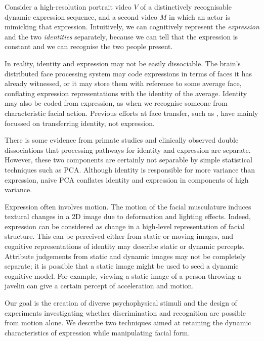 \documentclass[runningheads]{llncs}
\begin{document}
Consider a high-resolution portrait video $V$ of a distinctively recognisable dynamic expression sequence, and a second video $M$ in which an actor is mimicking that expression. Intuitively, we can cognitively represent the \textit{expression} and the two \textit{identities} separately, because we can tell that the expression is constant and we can recognise the two people present.



In reality, identity and expression may not be easily dissociable. The brain's distributed face processing system\cite{haxby2000distributed} may code expressions in terms of faces it has already witnessed, or it may store them with reference to some average face, conflating expression representations with the identity of the average. Identity may also be coded from expression, as when we recognise someone from characteristic facial action. Previous efforts at face transfer, such as \cite{bitouk2008face}, have mainly focussed on transferring identity, not expression.

There is some evidence from primate studies\cite{hasselmo1989role} and clinically observed double dissociations\cite{parry1991dissociable} that processing pathways for identity and expression are separate. However, these two components are certainly not separable by simple statistical techniques such as PCA. Although identity is responsible for more variance than expression, naive PCA conflates identity and expression in components of high variance\cite{calder2001principal}.

Expression often involves motion\cite{rosenblum1996human,essa1995facial,bassili1978facial}. The motion of the facial musculature induces textural changes in a 2D image due to deformation and lighting effects. Indeed, expression can be considered as change in a high-level representation of facial structure. This can be perceived either from static or moving images, and cognitive representations of identity may describe static or dynamic percepts. Attribute judgements from static and dynamic images may not be completely separate; it is possible that a static image might be used to seed a dynamic cognitive model. For example, viewing a static image of a person throwing a javelin can give a certain percept of acceleration and motion.


Our goal is the creation of diverse psychophysical stimuli and the design of experiments investigating whether discrimination and recognition are possible from motion alone.  We describe two techniques aimed at retaining the dynamic characteristics of expression while manipulating facial form.
\end{document}
